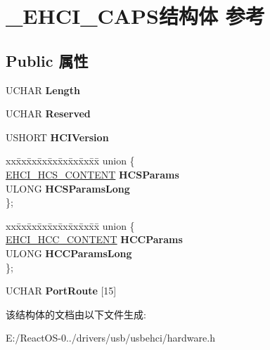 \hypertarget{struct___e_h_c_i___c_a_p_s}{}\section{\+\_\+\+E\+H\+C\+I\+\_\+\+C\+A\+P\+S结构体 参考}
\label{struct___e_h_c_i___c_a_p_s}
\subsection*{Public 属性}
\begin{DoxyCompactItemize}
\item 
\mbox{\label{struct___e_h_c_i___c_a_p_s_a634035da097225e2ded1c37a8f3e522f}} 
U\+C\+H\+AR {\bfseries Length}
\item 
\mbox{\label{struct___e_h_c_i___c_a_p_s_ada0f87d9a8c7c924c73f854b42071735}} 
U\+C\+H\+AR {\bfseries Reserved}
\item 
\mbox{\label{struct___e_h_c_i___c_a_p_s_a428866de249a17f1f01fe390afbe2d5a}} 
U\+S\+H\+O\+RT {\bfseries H\+C\+I\+Version}
\item 
\mbox{\label{struct___e_h_c_i___c_a_p_s_a541dd19596492eebb43f2bf32c342967}} 
\begin{tabbing}
xx\=xx\=xx\=xx\=xx\=xx\=xx\=xx\=xx\=\kill
union \{\\
\>\hyperlink{struct___e_h_c_i___h_c_s___c_o_n_t_e_n_t}{EHCI\_HCS\_CONTENT} {\bfseries HCSParams}\\
\>ULONG {\bfseries HCSParamsLong}\\
\}; \\

\end{tabbing}\item 
\mbox{\label{struct___e_h_c_i___c_a_p_s_af607ee4bc4b09cf74333e297758556b4}} 
\begin{tabbing}
xx\=xx\=xx\=xx\=xx\=xx\=xx\=xx\=xx\=\kill
union \{\\
\>\hyperlink{struct___e_h_c_i___h_c_c___c_o_n_t_e_n_t}{EHCI\_HCC\_CONTENT} {\bfseries HCCParams}\\
\>ULONG {\bfseries HCCParamsLong}\\
\}; \\

\end{tabbing}\item 
\mbox{\label{struct___e_h_c_i___c_a_p_s_ab7e5ba5f239610ae7c3ba6cce7924cfa}} 
U\+C\+H\+AR {\bfseries Port\+Route} \mbox{[}15\mbox{]}
\end{DoxyCompactItemize}


该结构体的文档由以下文件生成\+:\begin{DoxyCompactItemize}
\item 
E\+:/\+React\+O\+S-\/0../drivers/usb/usbehci/hardware.\+h\end{DoxyCompactItemize}

